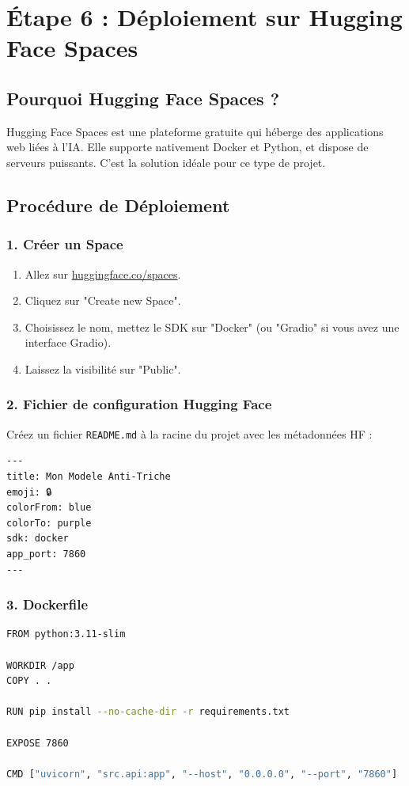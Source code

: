 \documentclass[a4paper,11pt]{article}
\begin{document}
\section{Étape 6 : Déploiement sur Hugging Face Spaces}

\subsection{Pourquoi Hugging Face Spaces ?}
Hugging Face Spaces est une plateforme gratuite qui héberge des applications web liées à l'IA. Elle supporte nativement Docker et Python, et dispose de serveurs puissants. C'est la solution idéale pour ce type de projet.

\subsection{Procédure de Déploiement}

\subsubsection{1. Créer un Space}
\begin{enumerate}
    \item Allez sur \href{https://huggingface.co/spaces}{huggingface.co/spaces}.
    \item Cliquez sur "Create new Space".
    \item Choisissez le nom, mettez le SDK sur "Docker" (ou "Gradio" si vous avez une interface Gradio).
    \item Laissez la visibilité sur "Public".
\end{enumerate}

\subsubsection{2. Fichier de configuration Hugging Face}
Créez un fichier \texttt{README.md} à la racine du projet avec les métadonnées HF :
\begin{lstlisting}[language=bash, caption=README.md - En-tete pour Hugging Face]
---
title: Mon Modele Anti-Triche
emoji: 🔒
colorFrom: blue
colorTo: purple
sdk: docker
app_port: 7860
---
\end{lstlisting}

\subsubsection{3. Dockerfile}
\begin{lstlisting}[language=bash, caption=Dockerfile]
FROM python:3.11-slim

WORKDIR /app
COPY . .

RUN pip install --no-cache-dir -r requirements.txt

EXPOSE 7860

CMD ["uvicorn", "src.api:app", "--host", "0.0.0.0", "--port", "7860"]
\end{lstlisting}
\end{document}
